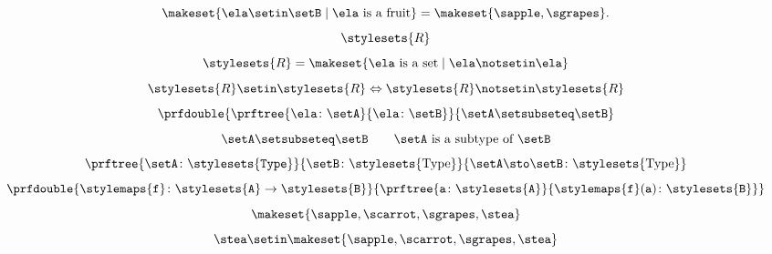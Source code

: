 {\begin{forslides}
    \begin{equation}
        \label{eq:stat_5_session1_22}
        \makeset{ \ela \setin\setB \mid \ela \text{ is a fruit} } = \makeset{ \sapple, \sgrapes }.
    \end{equation}
    \begin{equation}
        \label{eq:russel_session1_22}
        \stylesets{R}
    \end{equation}
    \begin{equation}
        \label{eq:russel_2_session1_22}
        \stylesets{R}=\makeset{\ela \text{ is a set}\mid \ela \notsetin \ela}
    \end{equation}
    \begin{equation}
        \label{eq:russel_3_session1_22}
        \stylesets{R} \setin \stylesets{R} \Leftrightarrow \stylesets{R} \notsetin \stylesets{R}
    \end{equation}
    \begin{equation}
        \label{eq:types_session1_22}
        \prfdouble{
            \prftree{\ela \colon \setA}{\ela \colon \setB}}{\setA \setsubseteq \setB}
    \end{equation}
    \begin{equation}
        \label{eq:types_2_session1_22}
        \setA \setsubseteq \setB \qquad \setA \text{ is a subtype of }\setB
    \end{equation}
    \begin{equation}
        \label{eq:types_3_session1_22}
        \prftree{\setA\colon \stylesets{\texttt{Type}}}{\setB\colon \stylesets{\text{Type}}}{{\setA \sto \setB \colon \stylesets{\text{Type}}}}
    \end{equation}
    \begin{equation}
        \label{eq:types_4_session1_22}
        \prfdouble{
            \stylemaps{\texttt{f}}\colon \stylesets{\texttt{A}}\to \stylesets{\texttt{B}}}{\prftree{\texttt{a}\colon \stylesets{\texttt{A}}}{\stylemaps{\texttt{f}}(\texttt{a})\colon \stylesets{\texttt{B}}}}
    \end{equation}
    \begin{equation}
        \label{eq:1_session1_22}
        \makeset{\sapple,\scarrot,\sgrapes,\stea}
    \end{equation}
    \begin{equation}
        \label{eq:2_session1_22}
        \stea \setin \makeset{\sapple,\scarrot,\sgrapes,\stea}
    \end{equation}
    \begin{equation}
        \label{eq:3_session1_22}

\end{equation}
\end{forslides}}
